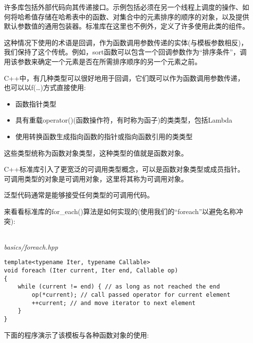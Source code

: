 
许多库包括外部代码向其传递接口。示例包括必须在另一个线程上调度的操作、如何将哈希值存储在哈希表中的函数、对集合中的元素排序的顺序的对象，以及提供默认参数值的通用包装器。标准库在这里也不例外，定义了许多使用此类的组件。

这种情况下使用的术语是回调，作为函数调用参数传递的实体(与模板参数相反)，我们保持了这个传统。例如，sort函数可以包含一个回调参数作为“排序条件”，调用该参数来确定一个元素是否在所需排序顺序的另一个元素之前。

C++中，有几种类型可以很好地用于回调，它们既可以作为函数调用参数传递，也可以以f(…)方式直接使用:

\begin{itemize}
\item
函数指针类型

\item
具有重载operator()(函数操作符，有时称为函子)的类类型，包括Lambda

\item
使用转换函数生成指向函数的指针或指向函数引用的类类型
\end{itemize}

这些类型统称为函数对象类型，这种类型的值就是函数对象。

C++标准库引入了更宽泛的可调用类型概念，可以是函数对象类型或成员指针。可调用类型的对象是可调用对象，这里将其称为可调用对象。

泛型代码通常是能够接受任何类型的可调用代码。


来看看标准库的for\_each()算法是如何实现的(使用我们的“foreach”以避免名称冲突):

\hspace*{\fill} \\ %
\noindent
\textit{basics/foreach.hpp}
\begin{lstlisting}[style=styleCXX]
template<typename Iter, typename Callable>
void foreach (Iter current, Iter end, Callable op)
{
	while (current != end) { // as long as not reached the end
		op(*current); // call passed operator for current element
		++current; // and move iterator to next element
	}
}
\end{lstlisting}

下面的程序演示了该模板与各种函数对象的使用:

